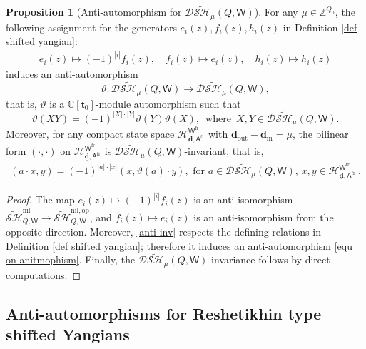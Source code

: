 \documentclass[10pt]{amsart}
\theoremstyle{definition}
\newtheorem{Proposition}[Theorem]{Proposition}
\numberwithin{equation}{section}
\newcommand{\bC}{\mathbb{C}}
\newcommand{\bZ}{\mathbb{Z}}
\newcommand{\bd}{\mathbf{d}}
\newcommand{\cH}{\mathcal{H}}
\newcommand{\sA}{\mathsf{A}}
\newcommand{\sW}{\mathsf{W}}
\newcommand{\In}{\operatorname{in}}
\newcommand{\Out}{\operatorname{out}}
\begin{document}
\begin{Proposition}[Anti-automorphism for $\mathcal D\widetilde{\mathcal{SH}}_{\mu}(Q,\sW)$]
For any $\mu\in \bZ^{Q_0}$, the following assignment for the generators $e_i(z),f_i(z),h_i(z)$ in Definition \ref{def shifted yangian}:
\begin{align}\label{anti-inv}
    e_i(z)\mapsto (-1)^{|i|}f_i(z),\quad f_i(z)\mapsto e_i(z),\quad h_i(z)\mapsto h_i(z)
\end{align}
induces an anti-automorphism 
\begin{equation}\label{equ on anitmophism}\vartheta\colon \mathcal D\widetilde{\mathcal{SH}}_{\mu}(Q,\sW)\to \mathcal D\widetilde{\mathcal{SH}}_{\mu}(Q,\sW), \end{equation} 
that is, $\vartheta$ is a $\bC[\mathsf t_0]$-module automorphism such that 
$$\vartheta(XY)=(-1)^{|X|\cdot|Y|}\vartheta(Y)\vartheta(X), \,\,\, \mathrm{where}\,\,\, X,Y\in \mathcal D\widetilde{\mathcal{SH}}_{\mu}(Q,\sW).$$
Moreover, for any compact state space $\cH^{\sW^{\mathrm{fr}}}_{\underline{\bd},\sA^{\mathrm{fr}}}$ with $\bd_{\Out}-\bd_{\In}=\mu$, the bilinear form $(\cdot,\cdot)$ on $\cH^{\sW^{\mathrm{fr}}}_{\underline{\bd},\sA^{\mathrm{fr}}}$ is $\mathcal D\widetilde{\mathcal{SH}}_{\mu}(Q,\sW)$-invariant, that is,
\begin{align*}
    (a\cdot x,y)=(-1)^{|a|\cdot|x|}(x,\vartheta(a)\cdot y),\text{ for $a\in \mathcal D\widetilde{\mathcal{SH}}_{\mu}(Q,\sW)$, $x,y\in \cH^{\sW^{\mathrm{fr}}}_{\underline{\bd},\sA^{\mathrm{fr}}}$}\:.
\end{align*}
\end{Proposition}

\begin{proof}
The map $e_i(z)\mapsto (-1)^{|i|}f_i(z)$ is an anti-isomorphism $\widetilde{\mathcal{SH}}_{Q,\sW}^{\mathrm{nil}}\to \widetilde{\mathcal{SH}}_{Q,\sW}^{\mathrm{nil},\mathrm{op}}$, and $f_i(z)\mapsto e_i(z)$ is an anti-isomorphism from the opposite direction. Moreover, \eqref{anti-inv} respects the defining relations in Definition \ref{def shifted yangian}; therefore it induces an anti-automorphism \eqref{equ on anitmophism}. Finally, the $\mathcal D\widetilde{\mathcal{SH}}_{\mu}(Q,\sW)$-invariance follows by direct computations.
\end{proof}


\subsection{Anti-automorphisms for Reshetikhin type shifted Yangians}\label{sect on anti-auto}
\end{document}
